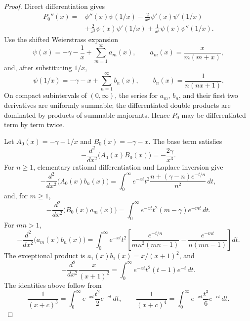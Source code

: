 \documentclass[11pt]{article}
\numberwithin{equation}{section}
\theoremstyle{definition}
\theoremstyle{remark}
\newcommand{\1}{\mathbf 1}
\begin{document}
\begin{proof}
Direct differentiation gives
\begin{equation}
\label{eq:p0-second-derivative}
\begin{aligned}
P_0''(x)
=&\psi''(x)\psi(1/x)
-\frac{2}{x^2}\psi'(x)\psi'(1/x)\\
&+\frac{2}{x^3}\psi(x)\psi'(1/x)
+\frac{1}{x^4}\psi(x)\psi''(1/x).
\end{aligned}
\end{equation}
Use the shifted Weierstrass expansion
\begin{equation}
\label{eq:digamma-shifted-expansion}
\psi(x)=-\gamma-\frac1x+\sum_{m=1}^{\infty}a_m(x),
\qquad
a_m(x)=\frac{x}{m(m+x)},
\end{equation}
and, after substituting \(1/x\),
\begin{equation}
\label{eq:reciprocal-digamma-shifted-expansion}
\psi(1/x)=-\gamma-x+\sum_{n=1}^{\infty}b_n(x),
\qquad
b_n(x)=\frac1{n(nx+1)}.
\end{equation}
On compact subintervals of \((0,\infty)\), the series for \(a_m\), \(b_n\), and their first two derivatives are uniformly summable; the differentiated double products are dominated by products of summable majorants.  Hence \(P_0\) may be differentiated term by term twice.

Let \(A_0(x)=-\gamma-1/x\) and \(B_0(x)=-\gamma-x\).  The base term satisfies
\begin{equation}
\label{eq:p0-base-term}
-\frac{d^2}{dx^2}\bigl(A_0(x)B_0(x)\bigr)=-\frac{2\gamma}{x^3}.
\end{equation}
For \(n\ge1\), elementary rational differentiation and Laplace inversion give
\begin{equation}
\label{eq:p0-a0bn-laplace}
-\frac{d^2}{dx^2}\bigl(A_0(x)b_n(x)\bigr)
=\int_0^\infty e^{-xt}t^2\frac{n+(\gamma-n)e^{-t/n}}{n^2}\,dt,
\end{equation}
and, for \(m\ge1\),
\begin{equation}
\label{eq:p0-b0am-laplace}
-\frac{d^2}{dx^2}\bigl(B_0(x)a_m(x)\bigr)
=\int_0^\infty e^{-xt}t^2(m-\gamma)e^{-mt}\,dt.
\end{equation}
For \(mn>1\),
\begin{equation}
\label{eq:p0-ambn-laplace}
-\frac{d^2}{dx^2}\bigl(a_m(x)b_n(x)\bigr)
=\int_0^\infty e^{-xt}t^2
\left[
\frac{e^{-t/n}}{mn^2(mn-1)}
-\frac{e^{-mt}}{n(mn-1)}
\right]dt.
\end{equation}
The exceptional product is \(a_1(x)b_1(x)=x/(x+1)^2\), and
\begin{equation}
\label{eq:p0-exceptional-laplace}
-\frac{d^2}{dx^2}\frac{x}{(x+1)^2}
=\int_0^\infty e^{-xt}t^2(t-1)e^{-t}\,dt.
\end{equation}
The identities above follow from
\begin{equation}
\label{eq:p0-laplace-powers}
\frac1{(x+c)^3}=\int_0^\infty e^{-xt}\frac{t^2}{2}e^{-ct}\,dt,
\qquad
\frac1{(x+c)^4}=\int_0^\infty e^{-xt}\frac{t^3}{6}e^{-ct}\,dt.
\end{equation}


\end{proof}
\end{document}
